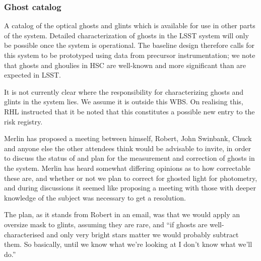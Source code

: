 \subsubsection{Ghost catalog}\label{sec:CPP:output:GhostCatalog}
A catalog of the optical ghosts and glints which is available for use in other parts of the system. Detailed characterization of ghosts in the LSST system will only be possible once the system is operational. The baseline design therefore calls for this system to be prototyped using data from precursor instrumentation; we note that ghosts and ghoulies in \eg HSC are well-known and more significant than are expected in LSST.
\begin{note}
It is not currently clear where the responsibility for characterizing ghosts and glints in the system lies. We assume it is outside this WBS. On realising this, RHL instructed that it be noted that this constitutes a possible new entry to the risk registry.
\end{note}
\begin{note}
Merlin has proposed a meeting between himself, Robert, John Swinbank, Chuck and anyone else the other attendees think would be advisable to invite, in order to discuss the status of and plan for the measurement and correction of ghosts in the system. Merlin has heard somewhat differing opinions as to how correctable these are, and whether or not we plan to correct for ghosted light for photometry, and during discussions it seemed like proposing a meeting with those with deeper knowledge of the subject was necessary to get a resolution.

The plan, as it stands from Robert in an email, was that we would apply an oversize mask to glints, assuming they are rare, and ``if ghosts are well-characterised and only very bright stars matter we would probably subtract them. So basically, until we know what we're looking at I don't know what we'll do.''
\end{note}



%
%


